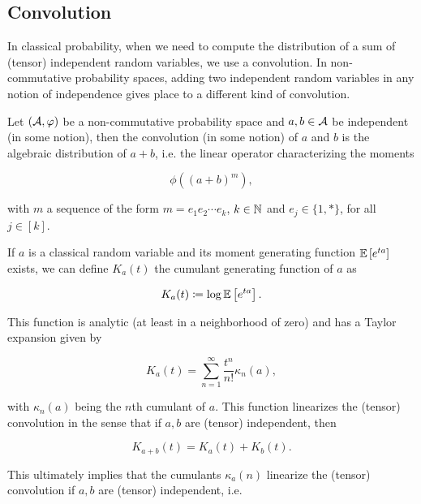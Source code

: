 \subsection{Convolution}

    In classical probability, when we need to compute the distribution of a sum of (tensor) independent random variables, we use a convolution. In non-commutative probability spaces, adding two independent random variables in any notion of independence gives place to a different kind of convolution.

    \begin{definition}
        Let $(\mathcal A,\varphi)$ be a non-commutative probability space and $a,b\in\mathcal A$ be independent (in some notion), then the convolution (in some notion) of $a$ and $b$ is the algebraic distribution of $a+b$, i.e. the linear operator characterizing the moments

        \begin{equation*}
            \phi\left((a+b)^{m}\right),
        \end{equation*}

        \noindent with $m$ a sequence of the form $m = e_1 e_2 \cdots e_k$, $k\in \mathbb N$ and $e_j \in \{1,*\}$, for all $j \in [k]$.
    \end{definition}

    If $a$ is a classical random variable and its moment generating function $\mathbb E \left[ e^{ta} \right]$ exists, we can define $K_a(t)$ the cumulant generating function of $a$ as

    \begin{equation*}
        K_a(t) \coloneqq \log \mathbb E \left[  e^{ta}  \right].
    \end{equation*}

    This function is analytic (at least in a neighborhood of zero) and has a Taylor expansion given by

    \begin{equation*}
        K_a(t) =  \sum_{n=1}^\infty \frac{t^n}{n!} \kappa_n(a),
    \end{equation*}

    \noindent with $\kappa_n(a)$ being the $n$th cumulant of $a$. This function linearizes the (tensor) convolution in the sense that if $a,b$ are (tensor) independent, then

    \begin{equation*}
        K_{a+b}(t) = K_a(t)+K_b(t).
    \end{equation*}

    This ultimately implies that the cumulants $\kappa_a(n)$ linearize the (tensor) convolution if $a,b$ are (tensor) independent, i.e.

